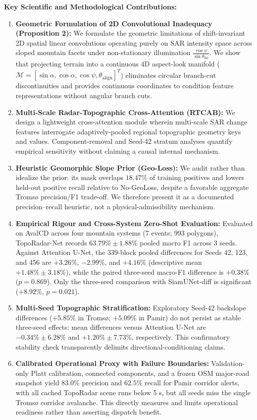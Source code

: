 \documentclass[11pt,a4paper]{article}
\begin{document}
\medskip
\noindent
\textbf{Key Scientific and Methodological Contributions:}
\begin{enumerate}
    \item \textbf{Geometric Formulation of 2D Convolutional Inadequacy (Proposition 2):} We formulate the geometric limitations of shift-invariant 2D spatial linear convolutions operating purely on SAR intensity space across sloped mountain facets under non-stationary illumination $\frac{\cos \psi}{\sin \theta_{\text{inc}}}$. We show that projecting terrain into a continuous 4D aspect-look manifold ($\mathcal{M} = [\sin \alpha, \cos \alpha, \cos \psi, \theta_{\text{align}}]^T$) eliminates circular branch-cut discontinuities and provides continuous coordinates to condition feature representations without angular branch cuts.
    \item \textbf{Multi-Scale Radar-Topographic Cross-Attention (RTCAB):} We design a lightweight cross-attention module wherein multi-scale SAR change features interrogate adaptively-pooled regional topographic geometry keys and values. Component-removal and Seed-42 stratum analyses quantify empirical sensitivity without claiming a causal internal mechanism.
    \item \textbf{Heuristic Geomorphic Slope Prior (Geo-Loss):} We audit rather than idealize the prior: its mask overlaps $18.47\%$ of training positives and lowers held-out positive recall relative to No-GeoLoss, despite a favorable aggregate Troms{\o} precision/F1 trade-off. We therefore present it as a documented precision--recall heuristic, not a physical-admissibility mechanism.
    \item \textbf{Empirical Rigour and Cross-System Zero-Shot Evaluation:} Evaluated on AvalCD across four mountain systems (7 events; 993 polygons), TopoRadar-Net records $63.79\% \pm 1.88\%$ pooled macro F1 across 3 seeds. Against Attention U-Net, the 339-block pooled differences for Seeds 42, 123, and 456 are $+3.26\%$, $-2.99\%$, and $+4.16\%$ (descriptive mean $+1.48\% \pm 3.18\%$), while the paired three-seed macro-F1 difference is $+0.38\%$ ($p=0.869$). Only the three-seed comparison with SiamUNet-diff is significant ($+8.92\%$, $p=0.021$).
    \item \textbf{Multi-Seed Topographic Stratification:} Exploratory Seed-42 backslope differences ($+5.85\%$ in Troms{\o}; $+5.09\%$ in Pamir) do not persist as stable three-seed effects: mean differences versus Attention U-Net are $-0.34\% \pm 6.28\%$ and $+1.20\% \pm 7.73\%$, respectively. This confirmatory stability check transparently delimits directional-conditioning claims.
    \item \textbf{Calibrated Operational Proxy with Failure Boundaries:} Validation-only Platt calibration, connected components, and a frozen OSM major-road snapshot yield $83.0\%$ precision and $62.5\%$ recall for Pamir corridor alerts, with all cached TopoRadar scene runs below 5 s, but all seeds miss the single Troms{\o} corridor avalanche. This directly measures and limits operational readiness rather than asserting dispatch benefit.
\end{enumerate}
\end{document}
